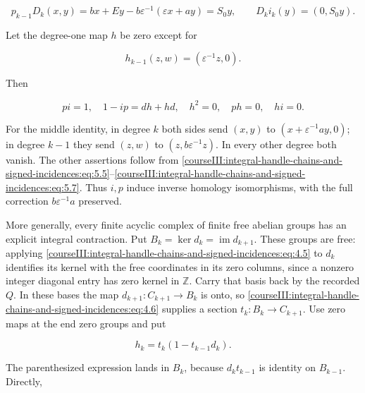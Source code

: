 \begin{equation}
p_{k-1}D_k(x,y)
 =bx+Ey-b\varepsilon^{-1}(\varepsilon x+ay)=S_0y,
 \qquad D_ki_k(y)=(0,S_0y).
 \label{courseIII:integral-handle-chains-and-signed-incidences:eq:5.6}
\end{equation}

Let the degree-one map \(h\) be zero except for

\begin{equation}
h_{k-1}(z,w)=(\varepsilon^{-1}z,0).
 \label{courseIII:integral-handle-chains-and-signed-incidences:eq:5.7}
\end{equation}

Then

\begin{equation}
pi=1,\quad 1-ip=dh+hd,\quad h^2=0,\quad ph=0,\quad hi=0.
 \label{courseIII:integral-handle-chains-and-signed-incidences:eq:5.8}
\end{equation}

For the middle identity, in degree \(k\) both sides send \((x,y)\) to \((x+\varepsilon^{-1}ay,0)\); in degree \(k-1\) they send \((z,w)\) to \((z,b\varepsilon^{-1}z)\). In every other degree both vanish. The other assertions follow from \eqref{courseIII:integral-handle-chains-and-signed-incidences:eq:5.5}--\eqref{courseIII:integral-handle-chains-and-signed-incidences:eq:5.7}. Thus \(i,p\) induce inverse homology isomorphisms, with the full correction \(b\varepsilon^{-1}a\) preserved.

More generally, every finite acyclic complex of finite free abelian groups has an explicit integral contraction. Put \(B_k=\ker d_k=\operatorname{im}d_{k+1}\). These groups are free: applying \eqref{courseIII:integral-handle-chains-and-signed-incidences:eq:4.5} to \(d_k\) identifies its kernel with the free coordinates in its zero columns, since a nonzero integer diagonal entry has zero kernel in \(\mathbb Z\). Carry that basis back by the recorded \(Q\). In these bases the map \(d_{k+1}:C_{k+1}\to B_k\) is onto, so \eqref{courseIII:integral-handle-chains-and-signed-incidences:eq:4.6} supplies a section \(t_k:B_k\to C_{k+1}\). Use zero maps at the end zero groups and put

\begin{equation}
h_k=t_k(1-t_{k-1}d_k).
 \label{courseIII:integral-handle-chains-and-signed-incidences:eq:5.9}
\end{equation}

The parenthesized expression lands in \(B_k\), because \(d_kt_{k-1}\) is identity on \(B_{k-1}\). Directly,

